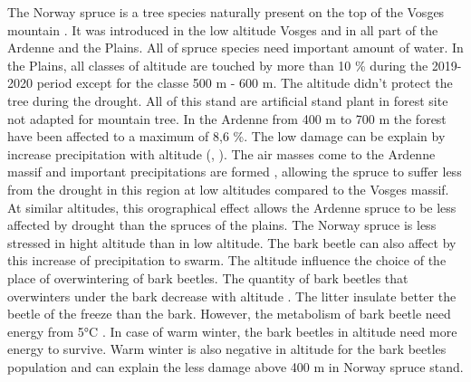 \documentclass[3p,procedia]{elsarticle}
\begin{document}
The Norway spruce is a tree species naturally present on the top of the Vosges mountain \citep{guinier_trois_1959}. 
It was introduced in the low altitude Vosges and in  all part of the Ardenne and the Plains. 
All of spruce species need important amount of water. 
In the Plains, all classes of altitude are touched by more than 10 \% during the 2019-2020 period except for the classe 500 m - 600 m. 
The altitude didn't protect the tree during the drought. 
All of this stand are artificial stand plant in forest site not adapted for mountain tree. 
In the Ardenne from 400 m to 700 m the forest have been affected to a maximum of 8,6 \%. 
The low damage can be explain by increase precipitation with altitude (\cite{kotlarski_elevation_2012}, \cite{Roe_orographic_preicpitation_2005}).
The air masses come to the Ardenne massif and important precipitations are formed  \citep{van_der_perre_carte_2015}, allowing the spruce to suffer less from the drought in this region at low altitudes compared to the Vosges massif. 
At similar altitudes, this orographical effect allows the Ardenne spruce to be less affected by drought than the spruces of the plains.
The Norway spruce is less stressed in hight altitude than in low altitude. 
The bark beetle can also affect by this increase of precipitation to swarm. 
The altitude influence the choice of the place of overwintering of bark beetles.
The quantity of bark beetles that overwinters under the bark decrease with altitude \citep{kasumovic_overwintering_2019}.
The litter insulate better the beetle of the freeze \citep{lombardero_cold_2000} than the bark.
However, the metabolism of bark beetle need energy from 5°C  \citep{kostal_physiological_2011}.
In case of warm winter, the bark beetles in altitude need more energy to survive. 
Warm winter is also negative in altitude for the bark beetles population and can explain the less damage above 400 m in Norway spruce  stand.

\end{document}
